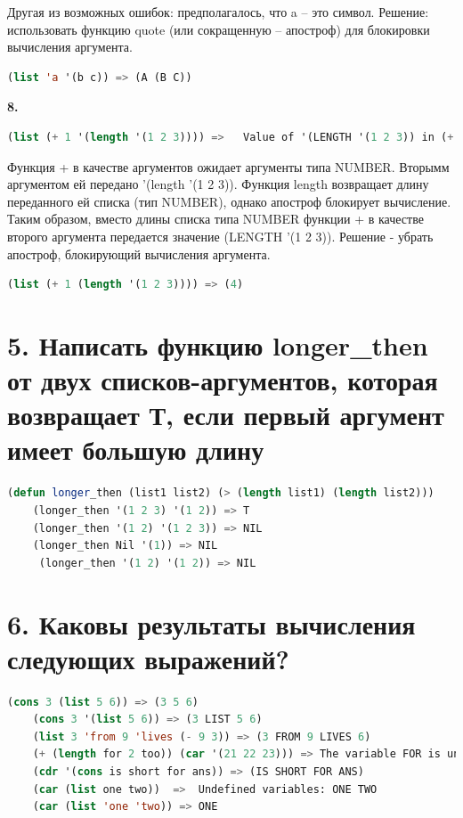 \documentclass[12pt]{report}
\begin{document}
Другая из возможных ошибок: предполагалось, что a -- это символ. Решение: использовать функцию quote (или сокращенную -- апостроф) для блокировки вычисления аргумента.
\begin{lstlisting}[language=Lisp]
	(list 'a '(b c)) => (A (B C))
\end{lstlisting}








\textbf{8.} 

\begin{lstlisting}[language=Lisp]
	(list (+ 1 '(length '(1 2 3)))) =>   Value of '(LENGTH '(1 2 3)) in (+ 1 '(LENGTH '(1 2 3))) is (LENGTH '(1 2 3)), not a NUMBER.
\end{lstlisting}

Функция + в качестве аргументов ожидает аргументы типа NUMBER. Вторымм аргументом ей передано '(length '(1 2 3)). Функция length возвращает длину переданного ей списка (тип NUMBER), однако апостроф блокирует вычисление. Таким образом, вместо длины списка типа NUMBER функции + в качестве второго аргумента передается значение (LENGTH '(1 2 3)). Решение - убрать апостроф, блокирующий вычисления аргумента.

\begin{lstlisting}[language=Lisp]
	(list (+ 1 (length '(1 2 3)))) => (4)
\end{lstlisting}






\section*{5. Написать функцию longer\_then от двух списков-аргументов, которая возвращает Т, если первый аргумент имеет большую длину}

\begin{lstlisting}[language=Lisp]
	(defun longer_then (list1 list2) (> (length list1) (length list2)))
	(longer_then '(1 2 3) '(1 2)) => T
	(longer_then '(1 2) '(1 2 3)) => NIL
	(longer_then Nil '(1)) => NIL
	 (longer_then '(1 2) '(1 2)) => NIL
\end{lstlisting}

\section*{6. Каковы результаты вычисления следующих выражений?}

\begin{lstlisting}[language=Lisp]
	(cons 3 (list 5 6)) => (3 5 6)
	(cons 3 '(list 5 6)) => (3 LIST 5 6)
	(list 3 'from 9 'lives (- 9 3)) => (3 FROM 9 LIVES 6)
	(+ (length for 2 too)) (car '(21 22 23))) => The variable FOR is unbound.
	(cdr '(cons is short for ans)) => (IS SHORT FOR ANS)
	(car (list one two))  =>  Undefined variables: ONE TWO
	(car (list 'one 'two)) => ONE
\end{lstlisting}
\end{document}
